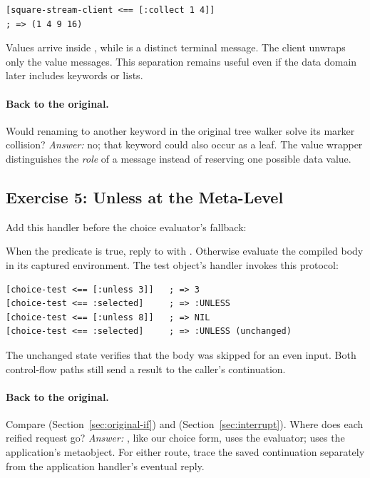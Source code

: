 
\begin{lstlisting}
[square-stream-client <== [:collect 1 4]]
; => (1 4 9 16)
\end{lstlisting}

Values arrive inside \code{[:value x]}, while  is a distinct
terminal message. The client unwraps only the value messages.
This separation remains useful even if the data domain later includes
keywords or lists.

\paragraph{Back to the original.}
Would renaming  to another keyword in the original tree
walker solve its marker collision? \emph{Answer:} no; that keyword could
also occur as a leaf. The value wrapper distinguishes the \emph{role}
of a message instead of reserving one possible data value.

\subsection{Exercise 5: Unless at the Meta-Level}
\label{sol:unless}

Add this handler before the choice evaluator's fallback:


When the predicate is true, reply to  with .
Otherwise evaluate the compiled body in its captured environment.
The test object's  handler invokes this protocol:

\begin{codeblock}
\begin{lstlisting}
[choice-test <== [:unless 3]]   ; => 3
[choice-test <== :selected]     ; => :UNLESS
[choice-test <== [:unless 8]]   ; => NIL
[choice-test <== :selected]     ; => :UNLESS (unchanged)
\end{lstlisting}
\end{codeblock}

The unchanged state verifies that the body was skipped for an even input.
Both control-flow paths still send a result to the caller's continuation.

\paragraph{Back to the original.}
Compare  (Section~\ref{sec:original-if}) and
 (Section~\ref{sec:interrupt}). Where does each
reified request go? \emph{Answer:} , like our choice form,
uses the evaluator;  uses the application's metaobject.
For either route, trace the saved continuation separately from the
application handler's eventual \code{!} reply.
